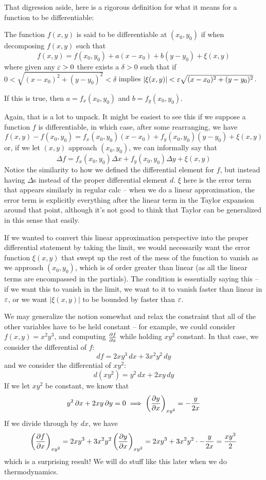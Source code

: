 That digression aside, here is a rigorous definition for what it means for a function to be differentiable: 
\begin{theorem}[Differentiability]
The function $f(x, y)$ is said to be differentiable at $(x_0, y_0)$ if when decomposing $f(x, y)$ such that 
\[
	f(x, y) = f(x_0, y_0) + a (x-x_0) + b (y-y_0) + \xi(x, y)
\]
where given any $\varepsilon > 0$ there exists a $\delta > 0$ such that if $0 < \sqrt{(x-x_0)^2 + (y-y_0)^2} < \delta$ implies $|\xi(x, y)| < \varepsilon \sqrt{(x-x_0)^2 + (y-y_0)^2}$.

If this is true, then $a = f_x(x_0, y_0)$ and $b = f_y(x_0, y_0)$. 
\end{theorem}

Again, that is a lot to unpack. It might be easiest to see this if we suppose a function $f$ is differentiable, in which case, after some rearranging, we have
\[
	f(x, y) - f(x_0, y_0) = f_x(x_0, y_0) (x-x_0) + f_y(x_0, y_0) (y -y_0) + \xi(x, y)
\]
or, if we let $(x, y)$ approach $(x_0, y_0)$, we can informally say that 
\[
	\Delta f = f_x(x_0, y_0) \Delta x + f_y(x_0, y_0) \Delta y + \xi(x, y)
\]
Notice the similarity to how we defined the differential element for $f$, but instead having $\Delta$s instead of the proper differential element $d$. $\xi$ here is the error term that appears similarly in regular calc -- when we do a linear approximation, the error term is explicitly everything after the linear term in the Taylor expansion around that point, although it's not good to think that Taylor can be generalized in this sense that easily. 

If we wanted to convert this linear approximation perspective into the proper differential statement by taking the limit, we would necessarily want the error function $\xi(x,y)$ that swept up the rest of the mess of the function to vanish as we approach $(x_0, y_0)$, which is of order greater than linear (as all the linear terms are encompassed in the partials). The condition is essentially saying this -- if we want this to vanish in the limit, we want to it to vanish faster than linear in $\varepsilon$, or we want $|\xi(x,y)|$ to be bounded by faster than $\varepsilon$.

We may generalize the notion somewhat and relax the constraint that all of the other variables have to be held constant -- for example, we could consider $f(x, y) = x^2y^3$, and computing $\frac{\partial f}{\partial x}$ while holding $xy^2$ constant. In that case, we consider the differential of $f$: 
\[
	df = 2xy^3 \, dx + 3x^2y^2 \, dy
\]
and we consider the differential of $xy^2$: 
\[
	d(xy^2) = y^2 \, dx + 2xy \, dy
\]
If we let $xy^2$ be constant, we know that 
\[
	y^2 \, \partial x + 2xy \, \partial y = 0 \implies \left(\frac{\partial y}{\partial x}\right)_{xy^2} = -\frac{y}{2x}
\]
If we divide through by $dx$, we have 
\[
	\left(\frac{\partial f}{\partial x}\right)_{xy^2} = 2xy^3 + 3x^2y^2 \left(\frac{\partial y}{\partial x}\right)_{xy^2} = 2xy^3 + 3x^2y^2 \cdot -\frac{y}{2x} = \frac{xy^3}{2} 
\]
which is a surprising result! We will do stuff like this later when we do thermodynamics. 

